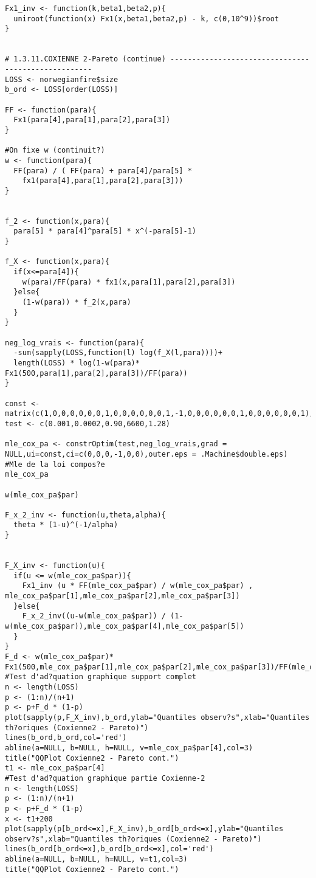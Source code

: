 \begin{verbatim}
Fx1_inv <- function(k,beta1,beta2,p){ 
  uniroot(function(x) Fx1(x,beta1,beta2,p) - k, c(0,10^9))$root
}


# 1.3.11.COXIENNE 2-Pareto (continue) ----------------------------------------------------
LOSS <- norwegianfire$size
b_ord <- LOSS[order(LOSS)]

FF <- function(para){
  Fx1(para[4],para[1],para[2],para[3])
}

#On fixe w (continuit?)
w <- function(para){
  FF(para) / ( FF(para) + para[4]/para[5] * 
  	fx1(para[4],para[1],para[2],para[3]))
}


f_2 <- function(x,para){
  para[5] * para[4]^para[5] * x^(-para[5]-1)
}

f_X <- function(x,para){
  if(x<=para[4]){
    w(para)/FF(para) * fx1(x,para[1],para[2],para[3])
  }else{
    (1-w(para)) * f_2(x,para)
  } 
}

neg_log_vrais <- function(para){
  -sum(sapply(LOSS,function(l) log(f_X(l,para))))+	
  length(LOSS) * log(1-w(para)* Fx1(500,para[1],para[2],para[3])/FF(para))
}

const <- matrix(c(1,0,0,0,0,0,0,1,0,0,0,0,0,0,1,-1,0,0,0,0,0,0,1,0,0,0,0,0,0,1),6,5)
test <- c(0.001,0.0002,0.90,6600,1.28)

mle_cox_pa <- constrOptim(test,neg_log_vrais,grad = NULL,ui=const,ci=c(0,0,0,-1,0,0),outer.eps = .Machine$double.eps)
#Mle de la loi compos?e
mle_cox_pa

w(mle_cox_pa$par)

F_x_2_inv <- function(u,theta,alpha){
  theta * (1-u)^(-1/alpha)
}


F_X_inv <- function(u){
  if(u <= w(mle_cox_pa$par)){
    Fx1_inv (u * FF(mle_cox_pa$par) / w(mle_cox_pa$par) , mle_cox_pa$par[1],mle_cox_pa$par[2],mle_cox_pa$par[3])
  }else{
    F_x_2_inv((u-w(mle_cox_pa$par)) / (1-w(mle_cox_pa$par)),mle_cox_pa$par[4],mle_cox_pa$par[5])
  }
}
F_d <- w(mle_cox_pa$par)* Fx1(500,mle_cox_pa$par[1],mle_cox_pa$par[2],mle_cox_pa$par[3])/FF(mle_cox_pa$par)
#Test d'ad?quation graphique support complet
n <- length(LOSS)
p <- (1:n)/(n+1)
p <- p+F_d * (1-p)
plot(sapply(p,F_X_inv),b_ord,ylab="Quantiles observ?s",xlab="Quantiles th?oriques (Coxienne2 - Pareto)")
lines(b_ord,b_ord,col='red')
abline(a=NULL, b=NULL, h=NULL, v=mle_cox_pa$par[4],col=3)
title("QQPlot Coxienne2 - Pareto cont.")
t1 <- mle_cox_pa$par[4]
#Test d'ad?quation graphique partie Coxienne-2
n <- length(LOSS)
p <- (1:n)/(n+1)
p <- p+F_d * (1-p)
x <- t1+200
plot(sapply(p[b_ord<=x],F_X_inv),b_ord[b_ord<=x],ylab="Quantiles observ?s",xlab="Quantiles th?oriques (Coxienne2 - Pareto)")
lines(b_ord[b_ord<=x],b_ord[b_ord<=x],col='red')
abline(a=NULL, b=NULL, h=NULL, v=t1,col=3)
title("QQPlot Coxienne2 - Pareto cont.")



\end{verbatim}
